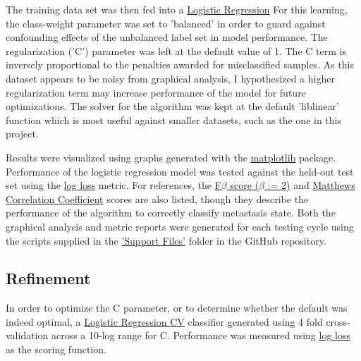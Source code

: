 \documentclass[final]{article}
\begin{document}
The training data set was then fed into a
\href{http://scikit-learn.org/stable/modules/generated/sklearn.linear_model.LogisticRegression.html}{Logistic
Regression} For this learning, the class-weight parameter was set to 'balanced'
in order to guard against confounding effects of the unbalanced label set in
model performance.  The regularization ('C') parameter was left at the default
value of 1.  The C term is inversely proportional to the penalties awarded for
misclassified samples. As this dataset appears to be noisy from graphical
analysis, I hypothesized a higher regularization term may increase performance
of the model for future optimizations.  The solver for the algorithm was kept at
the default 'liblinear' function which is most useful against smaller datasets,
such as the one in this project.

Results were visualized using graphs generated with the \href{http://matplotlib.org/index.html}{matplotlib}
package.  Performance of the
logistic regression model was tested against the held-out test set using the
\href{http://scikit-learn.org/stable/modules/generated/sklearn.metrics.log_loss.html#sklearn.metrics.log_loss}{log loss}
metric.  For references, the \href{http://scikit-learn.org/stable/modules/generated/sklearn.metrics.fbeta_score.html}{F$\beta$ score ($\beta$ := 2)}
and \href{http://scikit-learn.org/stable/modules/generated/sklearn.metrics.matthews_corrcoef.html}{Matthews Correlation
Coefficient}
scores are also listed, though they describe the performance of the algorithm to
correctly classify metastasis state.  Both the graphical analysis and metric
reports were generated for each testing cycle using the scripts supplied in the
\href{https://github.com/CCThompson82/MLE_capstone/tree/master/Support%20Files}{'Support Files'}
folder in the GitHub repository.

\subsection{Refinement}

In order to optimize the C parameter, or to determine whether the default was
indeed optimal,  a \href{http://scikit-learn.org/stable/modules/generated/sklearn.linear_model.LogisticRegressionCV.html#sklearn.linear_model.LogisticRegressionCV}{Logistic Regression CV}
classifier generated using 4 fold cross-validation across a 10-log range for C.
Performance was measured using \href{http://scikit-learn.org/stable/modules/generated/sklearn.metrics.log_loss.html#sklearn.metrics.log_loss}{log loss}
as the  scoring function.
\end{document}
